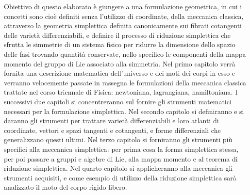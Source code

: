 Obiettivo di questo elaborato è giungere a una formulazione geometrica, in cui i concetti sono cioè definiti senza l'utilizzo di coordinate, della meccanica classica, attraverso la geometria simplettica definita canonicamente sui fibrati cotangenti delle varietà differenziabili, e definire il processo di riduzione simplettica che sfrutta le simmetrie di un sistema fisico per ridurre la dimensione dello spazio delle fasi trovando quantità conservate, nello specifico le componenti della mappa momento del gruppo di Lie associato alla simmetria. Nel primo capitolo verrà fornita una descrizione matematica dell'universo e dei moti dei corpi in esso e verranno velocemente passate in rassegna le formulazioni della meccanica classica trattate nel corso triennale di Fisica: newtoniana, lagrangiana, hamiltoniana. I successivi due capitoli si concentreranno sul fornire gli strumenti matematici necessari per la formulazione simplettica. Nel secondo capitolo si definiranno e si daranno gli strumenti per trattare varietà differenziabili e loro atlanti di coordinate, vettori e spazi tangenti e cotangenti, e forme differenziali che generalizzano questi ultimi. Nel terzo capitolo si forniranno gli strumenti più specifici alla meccanica simplettica: per prima cosa la forma simplettica stessa, per poi passare a gruppi e algebre di Lie, alla mappa momento e al teorema di riduzione simplettica. Nel quarto capitolo si applicheranno alla meccanica gli strumenti acquisiti, e come esempio di utilizzo della riduzione simplettica sarà analizzato il moto del corpo rigido libero.